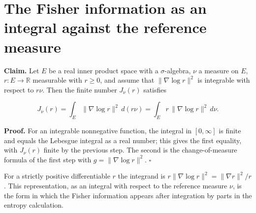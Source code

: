 \documentclass[11pt,a4paper]{article}
\begin{document}
\section{\texorpdfstring{The Fisher information as an integral against the reference measure}{The Fisher information as an integral against the reference measure}}


\textbf{Claim.} Let \(E\) be a real inner product space with a \(\sigma\)-algebra, \(\nu\) a measure on \(E\), \(r:E\to\mathbb R\) measurable with \(r\ge0\), and assume that \(\|\nabla\log r\|^2\) is integrable with respect to \(r\nu\). Then the finite number \(J_\nu(r)\) satisfies


\[J_\nu(r)=\int_E\|\nabla\log r\|^2\,d(r\nu)=\int_Er\,\|\nabla\log r\|^2\,d\nu.\]


\textbf{Proof.} For an integrable nonnegative function, the integral in \([0,\infty]\) is finite and equals the Lebesgue integral as a real number; this gives the first equality, with \(J_\nu(r)\) finite by the previous step. The second is the change-of-measure formula of the first step with \(g=\|\nabla\log r\|^2\). \(\square\)




For a strictly positive differentiable \(r\) the integrand is \(r\|\nabla\log r\|^2=\|\nabla r\|^2/r\). This representation, as an integral with respect to the reference measure \(\nu\), is the form in which the Fisher information appears after integration by parts in the entropy calculation.
\end{document}
